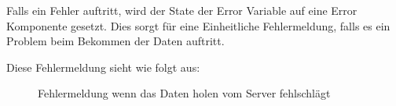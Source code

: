 Falls ein Fehler auftritt, wird der State der Error Variable auf eine Error Komponente gesetzt. Dies
sorgt für eine Einheitliche Fehlermeldung, falls es ein Problem beim Bekommen der Daten auftritt.

Diese Fehlermeldung sieht wie folgt aus:
\begin{figure}[H]
    \begin{center}
      \caption{Fehlermeldung wenn das Daten holen vom Server fehlschlägt}
    \end{center}
  \end{figure}
  
